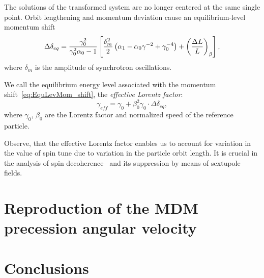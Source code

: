 \documentclass[a4paper]{jacow}
\begin{document}
The solutions of the transformed system are no longer centered at the same single point. Orbit lengthening
and momentum deviation cause an equilibrium-level momentum shift~\cite[p.~2581]{Senichev:IPAC13}
\begin{equation}\label{eq:EquLevMom_shift}
\Delta\delta_{eq} = \frac{\gamma_0^2}{\gamma_0^2\alpha_0 - 1}\bkt*{\frac{\delta_m^2}{2}\bkt{\alpha_1 - \alpha_0\gamma^{-2} + \gamma_0^{-4}} + \bkt{\frac{\Delta L}{L}}_\beta},
\end{equation}
where $\delta_m$ is the amplitude of synchrotron oscillations.

We call the equilibrium energy level associated with the momentum shift~\eqref{eq:EquLevMom_shift},
the \emph{effective Lorentz factor}:
\begin{equation}\label{eq:EffectiveGamma}
\gamma_{eff} = \gamma_0 + \beta_0^2\gamma_0\cdot\Delta\delta_{eq},
\end{equation}
where $\gamma_0$, $\beta_0$ are the Lorentz factor and normalized speed of the reference particle.

Observe, that the effective Lorentz factor enables us to account for variation in the value of spin tune
due to variation in the particle orbit length. It is crucial in the analysis of
spin decoherence~\cite{Aksentev:IPAC19:Decoh} and its suppression by means of sextupole fields.

\section{Reproduction of the MDM precession angular velocity}

\section{Conclusions}
 
\end{document}
